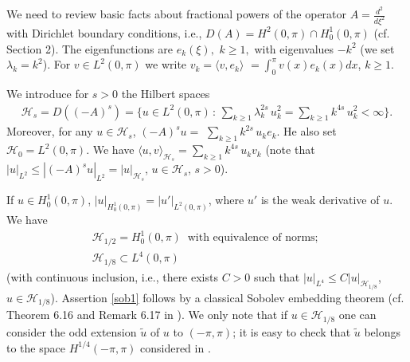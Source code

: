 \documentclass[preprint]{imsart}
\begin{document}
 
 \vskip 1mm 
 We need to review    basic facts about fractional powers of the  
operator  
$A = \frac{d^2}{d  \xi^2}$ with Dirichlet boundary conditions, i.e., $D(A) = H^2(0, \pi) \cap H^1_0 (0, \pi)$ (cf. Section 2).  The
eigenfunctions are
 $
 e_k (\xi),$ $  k \ge 1,
 $ with 
  eigenvalues $- k^2$ (we set
  $\lambda_k =   k^2 $). 
 For $v \in L^2(0, \pi)$ we write $v_k = \langle v,  e_k\rangle$ $= \int_0^{\pi} v(x) e_k (x) dx $, $k \ge 1$. 

 
We introduce  for $ s >0 $  the Hilbert spaces 
  \begin{equation}\label{s335}
   \begin{array}{l}
{\mathcal H}_{s} = D((-A)^s) = \big \{ u \in L^2(0, \pi) \, : \, \sum_{k \ge 1} \lambda_k^{2s} \,  u_k^2 =\sum_{k \ge 1} k^{4s} \,  u_k^2  < \infty \big \}.
\end{array} 
\end{equation}
Moreover, for any $u \in {\mathcal H}_s$, $(-A)^s u = $ $
 \sum_{k \ge 1} k^{2s} \,  u_k e_k  $. 
 He also set ${\mathcal H}_0 = L^2(0, \pi)$.
  We have $\langle  u,v \rangle_{{\mathcal H}_s} = \sum_{k \ge 1} k^{4s} \,  u_k v_k$  (note that $|u|_{L^2} \le |(-A)^s u|_{L^2}= |u|_{{\mathcal H}_s}$, $u \in {\mathcal H}_s $, $s >0$).  

 \vskip 1mm  If $u \in H^1_0 (0,\pi)   $,  $|u|_{H^1_0(0,\pi) } = |u'|_{L^2(0,\pi) }$, where $u' $ is  the weak derivative of $u$.   We have   
\begin{gather}\label{h1o}  
{\mathcal H}_{1/2} =  H^1_0(0,\pi) \;\; \text{with equivalence of norms;  }
\\ 
%   
\label{sob1}   
{\mathcal H}_{1/8} \subset L^4(0,\pi)
\end{gather}
(with continuous inclusion, i.e., there exists $C>0$ such that $|u|_{L^4} \le C |u|_{{\mathcal H}_{1/8}}$, $u \in {\mathcal H}_{1/8}$). 
 Assertion  \eqref{sob1} follows by a classical 
 Sobolev embedding theorem (cf. Theorem 6.16 and Remark 6.17 in \cite{hairer}). We only note that if $u \in {\mathcal H}_{1/8}$ one  can consider the odd extension $\tilde u$ of $u$ to $(- \pi , \pi)$; it is easy to check that $\tilde u$ belongs to the space $ H^{1/4}(-\pi, \pi) $ considered in \cite{hairer}. 
  
\end{document}
